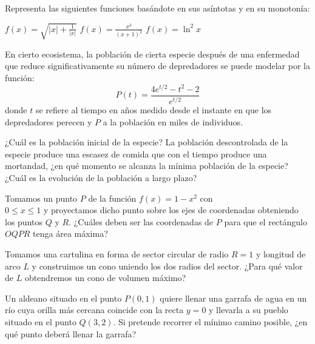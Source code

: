 \begin{ejemplo}{
Representa las siguientes funciones basándote en sus asíntotas y en su monotonía:
\begin{apartados}
    \ap $\displaystyle{f(x)=\sqrt{|x|+\frac1{|x|}}}$
    \ap $\displaystyle{f(x)=\frac{x^3}{(x+1)^2}}$
    \ap $\displaystyle{f(x)=\ln^2{x}}$
\end{apartados}
}
\end{ejemplo}

\begin{ejemplo}{
En cierto ecosistema, la población de cierta especie después de una enfermedad que reduce significativamente su número de depredadores se puede modelar por la función:
\[P(t)=\frac{4e^{t/2}-t^2-2}{e^{t/2}}\]
donde $t$ se refiere al tiempo en años medido desde el instante en que los depredadores perecen y $P$ a la población en miles de individuos.
\begin{apartados}
    \ap ¿Cuál es la población inicial de la especie?
    \ap La población descontrolada de la especie produce una escasez de comida que con el tiempo produce una mortandad, ¿en qué momento se alcanza la mínima población de la especie?
    \ap ¿Cuál es la evolución de la población a largo plazo?
\end{apartados}
}
\end{ejemplo}

\begin{ejemplo}{
Tomamos un punto $P$ de la función $f(x)=1-x^2$ con\\ $0\leqslant x\leqslant1$ y proyectamos dicho punto sobre los ejes de coordenadas obteniendo los puntos $Q$ y $R$. ¿Cuáles deben ser las coordenadas de $P$ para que el rectángulo $OQPR$ tenga área máxima?
}
\end{ejemplo}

\begin{ejemplo}{
Tomamos una cartulina en forma de sector circular de radio $R=1$ y longitud de arco $L$ y construimos un cono uniendo los dos radios del sector. ¿Para qué valor de $L$ obtendremos un cono de volumen máximo?
}
\end{ejemplo}

\begin{ejemplo}{
Un aldeano situado en el punto $P(0,1)$ quiere llenar una garrafa de agua en un río cuya orilla más cercana coincide con la recta $y=0$ y llevarla a su pueblo situado en el punto $Q(3,2)$. Si pretende recorrer el mínimo camino posible, ¿en qué punto deberá llenar la garrafa?
}
\end{ejemplo}

